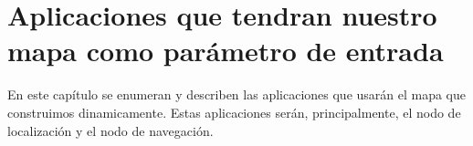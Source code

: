 \chapter{Aplicaciones que tendran nuestro mapa como parámetro de entrada}
\label{cap:aplicaciones}

En este capítulo se enumeran y describen las aplicaciones que usarán el mapa que construimos dinamicamente. Estas aplicaciones serán, principalmente, el nodo de localización y el nodo de navegación.

